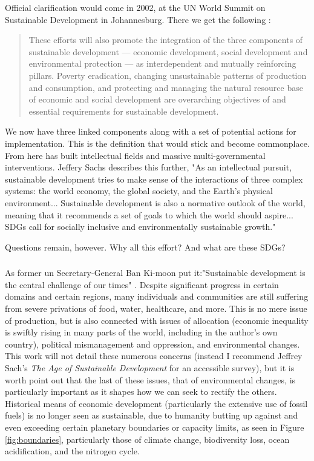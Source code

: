 Official clarification would come in 2002, at the UN World Summit on Sustainable Development in Johannesburg. There we get the following \cite{worldsummitonsustainabledevelopmentPlanImplementationWorld2002}:

\blockquote{These efforts will also promote the integration of the three components of sustainable development — economic development, social development and environmental protection — as interdependent and mutually reinforcing pillars. Poverty eradication, changing unsustainable patterns of production and
consumption, and protecting and managing the natural resource base of economic and social development are overarching objectives of and essential requirements for sustainable development.}

We now have three linked components along with a set of potential actions for implementation. This is the definition that would stick and become commonplace. From here has built intellectual fields and massive multi-governmental interventions. Jeffery Sachs describes this further, "As an intellectual pursuit, sustainable development tries to make sense of the interactions of three complex systems: the world economy, the global society, and the Earth's physical environment... Sustainable development is also a normative outlook of the world, meaning that it recommends a set of goals to which the world should aspire... SDGs call for socially inclusive and environmentally sustainable growth." \cite{sachsAgeSustainableDevelopment2015}

Questions remain, however. Why all this effort? And what are these SDGs?

\subsubsection{}

As former \ac{un} Secretary-General Ban Ki-moon put it:"Sustainable development is the central challenge of our times" \cite{sachsAgeSustainableDevelopment2015}. Despite significant progress in certain domains and certain regions, many individuals and communities are still suffering from severe privations of food, water, healthcare, and more. This is no mere issue of production, but is also connected with issues of allocation (economic inequality is swiftly rising in many parts of the world, including in the author's own country), political mismanagement and oppression, and environmental changes. This work will not detail these numerous concerns (instead I recommend Jeffrey Sach's \textit{The Age of Sustainable Development} for an accessible survey), but it is worth point out that the last of these issues, that of environmental changes, is particularly important as it shapes how we can seek to rectify the others. Historical means of economic development (particularly the extensive use of fossil fuels) is no longer seen as sustainable, due to humanity butting up against and even exceeding certain planetary boundaries or capacity limits, as seen in Figure \ref{fig:boundaries}, particularly those of climate change, biodiversity loss, ocean acidification, and the nitrogen cycle.

